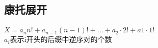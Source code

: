 \subsection{康托展开}
	\paragraph{}
		$ X = a_n  n! + a_{n-1}  (n - 1)! + ... + a_2 \cdot 2! + a1 \cdot 1! $ \\
		$ a_i $表示i开头的后缀中逆序对的个数
	
